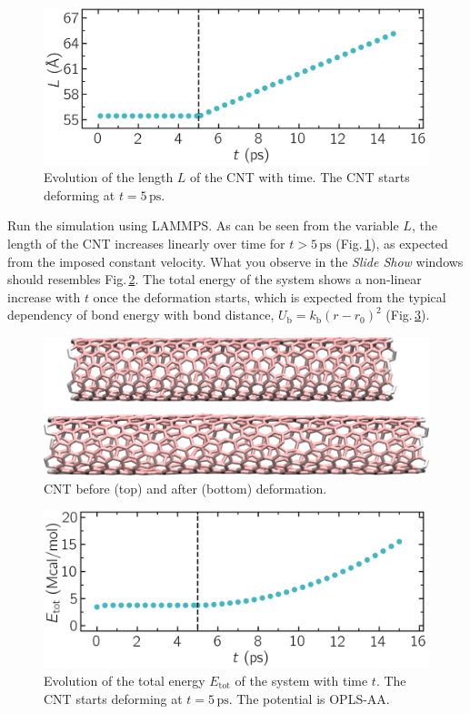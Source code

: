 \documentclass[9pt,tutorial]{livecoms}
\begin{document}
\begin{figure}
\centering
\includegraphics[width=\linewidth]{CNT-lenght-unbreakable}
\caption{Evolution of the length $L$ of the CNT with time. The CNT starts
deforming at $t = 5\,\text{ps}$.}
\label{fig:CNT-unbreakable-lenght}
\end{figure}

Run the simulation using LAMMPS. As can be seen from the variable $L$, the length
of the CNT increases linearly over time for $t > 5\,\text{ps}$ (Fig.\,\ref{fig:CNT-unbreakable-lenght}),
as expected from the imposed constant velocity. What you observe in the \textit{Slide Show}
windows should resembles Fig.\,\ref{fig:CNT-deformed-unbreakable}. The total energy of the system
shows a non-linear increase with $t$ once the deformation starts, which is expected
from the typical dependency of bond energy with bond distance,
$U_\text{b} = k_\text{b} \left( r - r_0 \right)^2$ (Fig.\,\ref{fig:CNT-unbreakable-energy}).

\begin{figure}
\centering
\includegraphics[width=\linewidth]{CNT-deformed-unbreakable}
\caption{CNT before (top) and after (bottom) deformation.}
\label{fig:CNT-deformed-unbreakable}
\end{figure}

\begin{figure}
\centering
\includegraphics[width=\linewidth]{CNT-energy-unbreakable}
\caption{Evolution of the total energy $E_\text{tot}$ of the system with time $t$.
The CNT starts deforming at $t = 5\,\text{ps}$. The potential is OPLS-AA.}
\label{fig:CNT-unbreakable-energy}
\end{figure}
\end{document}
